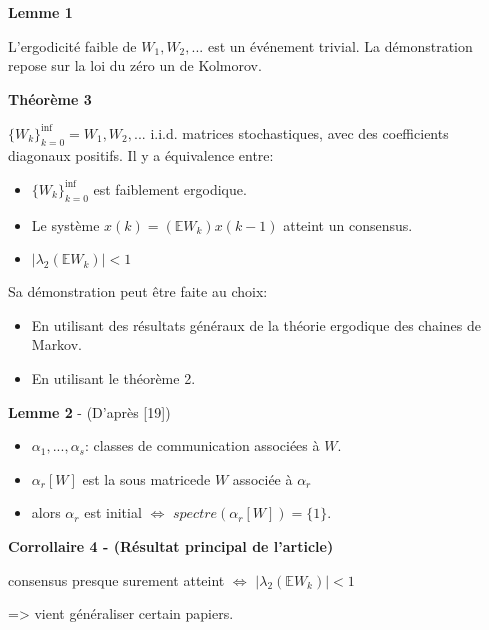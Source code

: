 \documentclass{beamer}
\begin{document}
\begin{frame}
	\textbf{Lemme 1}
	
	L'ergodicité faible de $W_1, W_2, ... $ est un événement trivial.
	\bigbreak
	\pause
	La démonstration repose sur la loi du zéro un de Kolmorov.
	
	\pause
	\textbf{Théorème 3}
	\begin{center}
		$\{W_k\}_{k=0}^{\inf} = W_1, W_2, ...$ i.i.d. matrices stochastiques, 
		avec des coefficients diagonaux positifs.
		\pause
		Il y a équivalence entre:
		\begin{itemize}
			\item $\{W_k\}_{k=0}^{\inf}$ est faiblement ergodique.
			\pause
			\item Le système $x(k) = (\mathbb{E}W_k)x(k-1)$ atteint un consensus.
			\item $| \lambda_2(\mathbb{E}W_k)| < 1$
		\end{itemize}
	\end{center}
	\pause
	\bigbreak
	Sa démonstration peut être faite au choix:
	\begin{itemize}
		\item En utilisant des résultats généraux de la théorie ergodique des chaines de Markov.
		\item En utilisant le théorème 2.
	\end{itemize}
\end{frame}
\begin{frame}
	\textbf{Lemme 2} - (D'après [19])
	\begin{itemize}
		\item $\alpha_1, ..., \alpha_s$: classes de communication associées à $W$.
		\item $\alpha_r[W]$ est la sous matricede $W$ associée à $\alpha_r$
		\item alors $\alpha_r$ est initial $\iff$ $spectre(\alpha_r[W]) = \{1\}$.
	\end{itemize}
\end{frame}
\begin{frame}
	\textbf{Corrollaire 4 - (Résultat principal de l'article)}
	\begin{center}
		consensus presque surement atteint
		$\iff$
		$|\lambda_{2}(\mathbb{E}W_k)| < 1$
	\end{center}
	\pause
	\bigbreak
	=> vient généraliser certain papiers.
\end{frame}
\end{document}
